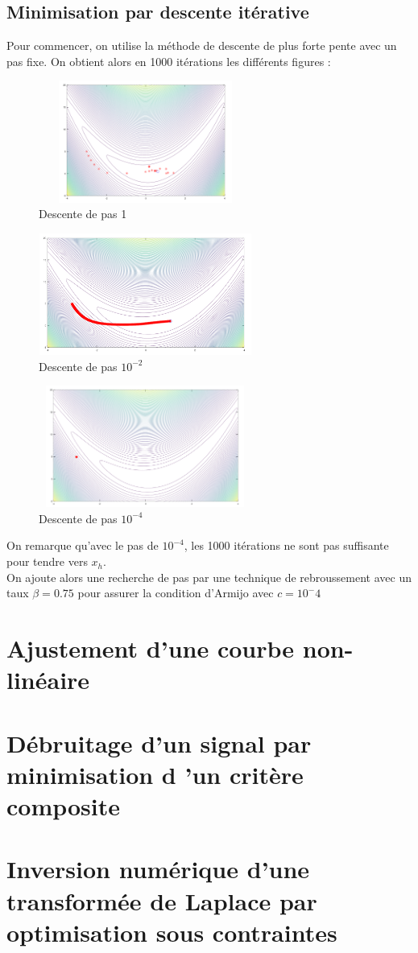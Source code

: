 \documentclass[a4paper, 10pt]{article}
\begin{document}
		\subsection{Minimisation par descente itérative}
		Pour commencer, on utilise la méthode de descente de plus forte pente avec un pas fixe.
		On obtient alors en 1000 itérations les différents figures : 
		\begin{figure}[H]
			\centering
			\includegraphics[width=7cm, height=4cm]{pasFixe1}
			\caption{Descente de pas 1}
		\end{figure}
		
		\begin{figure}[H]
			\centering
			\includegraphics[width=7cm, height=4cm]{pasFixe10moins2}
			\caption{Descente de pas $10^{-2}$}
		\end{figure}
		
		\begin{figure}[H]
			\centering
			\includegraphics[width=7cm, height=4cm]{pasFixe10moins4}
			\caption{Descente de pas $10^{-4}$}
		\end{figure}
		
		On remarque qu'avec le pas de $10^{-4}$, les 1000 itérations ne sont pas suffisante pour tendre vers $ x_h$.
		\\On ajoute alors une recherche de pas par une technique de rebroussement avec un taux $\beta = 0.75$ pour assurer la condition d'Armijo avec $c=10^-4$
	
	\newpage
	\section{Ajustement d'une courbe non-linéaire}
		
	\newpage
	\section{Débruitage d’un signal par minimisation d ’un critère composite}
	
	\newpage
	\section{Inversion numérique d’une transformée de Laplace par optimisation sous contraintes}
\end{document}
